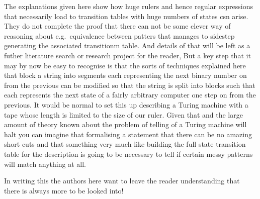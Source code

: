 The explanations given here show how huge rulers and hence regular expressions
that necessarily load to transition tables with huge numbers of states csn
arise. They do not complete the proof that there can not be some clever way
of reasoning about e.g.\ equivalence between patters that manages to sidestep
generating the associated transitionm table. And details of that will be
left as a futher literature search or research project for the reader, But
a key step that it may by now be easy to recognise is that the sorts of
techniques explained here that block a string into segments each representing
the next binary number on from the previous can be modified so that the
string is split into blocks such that each represents the next state
of a fairly arbitrary computer one step on from the previous. It would
be normal to set this up describing a Turing machine with a tape whose
length is limited to the size of our ruler. Given that and the large
amount of theory known about the problem of telling of a Turing machine
will halt you can imagine that formalising a statement that there can be
no amazing short cuts and that something very much like building the full
state transition table for the description is going to be necessary to
tell if certain messy patterns will match anything at all.

In writing this the authors here want to leave the reader understanding that
there is always more to be looked into!
